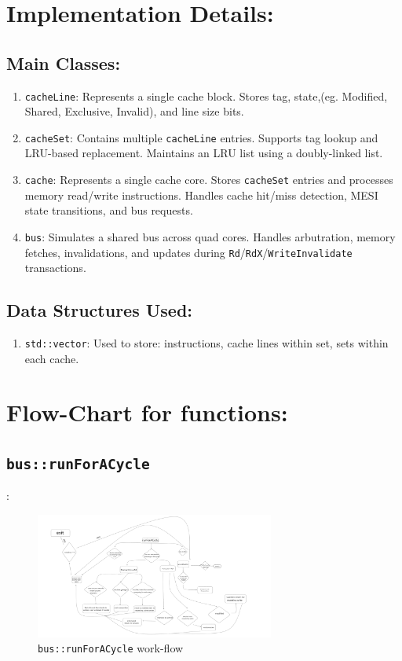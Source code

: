 \documentclass{article}
\begin{document}
\section{Implementation Details:}
\subsection{Main Classes:}
\begin{enumerate}
    \item \texttt{cacheLine}: Represents a single cache block. Stores tag, state,(eg. Modified, Shared, Exclusive, Invalid), and line size bits.
    \item \texttt{cacheSet}: Contains multiple \texttt{cacheLine} entries. Supports tag lookup and LRU-based replacement. Maintains an LRU list using a doubly-linked list.
    \item \texttt{cache}: Represents a single cache core. Stores \texttt{cacheSet} entries and processes memory read/write instructions. Handles cache hit/miss detection, MESI  state transitions, and bus requests.
    \item \texttt{bus}: Simulates a shared bus across quad cores. Handles arbutration, memory fetches, invalidations, and updates during \texttt{Rd}/\texttt{RdX}/\texttt{WriteInvalidate} transactions.
\end{enumerate}






\subsection{Data Structures Used:}
\begin{enumerate}
    \item \texttt{std::vector}: Used to store: instructions, cache lines within set, sets within each cache.
\end{enumerate}




\section{Flow-Chart for functions:}
\subsection{\texttt{bus::runForACycle}} : 
\begin{figure}[h]
  \centering
  \includegraphics[width=0.7\textwidth]{runForACycle.png}
  \caption{\texttt{bus::runForACycle} work-flow}
  \label{fig:arch}
\end{figure}
\end{document}

